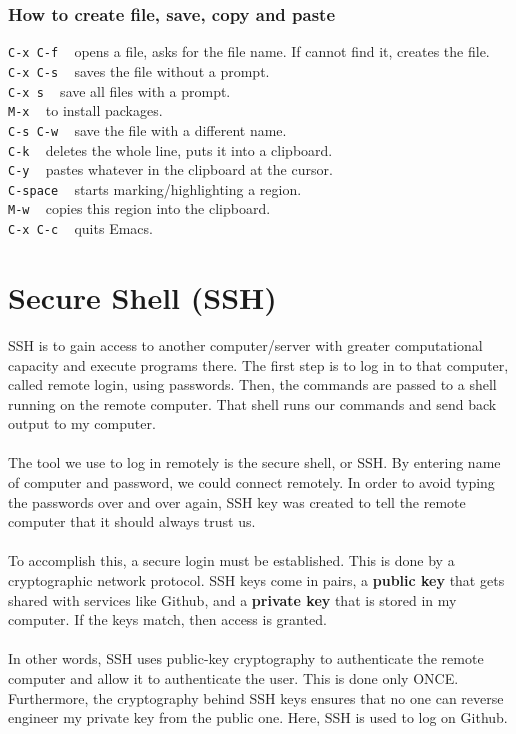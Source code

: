 \documentclass{article}
\begin{document}
{{\subsubsection{How to create file, save, copy and paste}
\texttt{C-x C-f} ~ opens a file, asks for the file name. If cannot find it, creates the file.\\
\texttt{C-x C-s} ~ saves the file without a prompt.\\
\texttt{C-x s} ~ save all files with a prompt.\\
\texttt{M-x} ~ to install packages. \\
\texttt{C-s C-w} ~ save the file with a different name.\\
\texttt{C-k} ~ deletes the whole line, puts it into a clipboard.\\
\texttt{C-y} ~ pastes whatever in the clipboard at the cursor.\\
\texttt{C-space} ~ starts marking/highlighting a region.\\
\texttt{M-w} ~ copies this region into the clipboard.\\
\texttt{C-x C-c} ~ quits Emacs.\\

\newpage
\section{Secure Shell (SSH)}

SSH is to gain access to another computer/server with greater computational capacity and execute programs there. The first step is to log in to that computer, called remote login, using passwords. Then, the commands are passed to a shell running on the remote computer. That shell runs our commands and send back output to my computer. \\
\\
The tool we use to log in remotely is the secure shell, or SSH. By entering name of computer and password, we could connect remotely. In order to avoid typing the passwords over and over again, SSH key was created to tell the remote computer that it should always trust us. \\
\\
To accomplish this, a secure login must be established. This is done by a cryptographic network protocol. SSH keys come in pairs, a \textbf{public key} that gets shared with services like Github, and a \textbf{private key} that is stored in my computer. If the keys match, then access is granted. \\
\\
In other words, SSH uses public-key cryptography to authenticate  the remote computer and allow it to authenticate the user. This is done only ONCE. Furthermore, the cryptography behind SSH keys ensures that no one can reverse engineer my private key from the public one. Here, SSH is used to log on Github.\\


}}
\end{document}
